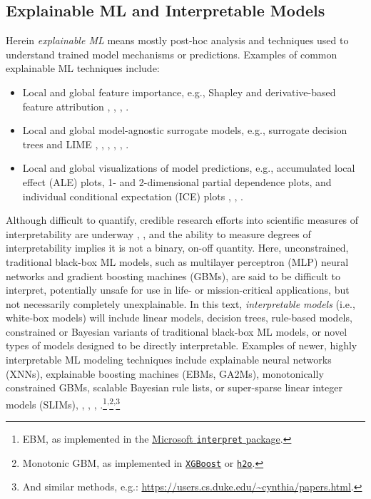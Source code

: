 \documentclass{article}
\begin{document}
\subsection{Explainable ML and Interpretable Models }

Herein \textit{explainable ML} means mostly post-hoc analysis and techniques used to understand trained model mechanisms or predictions. Examples of common explainable ML techniques include:

\begin{itemize}
\item Local and global feature importance, e.g., Shapley and derivative-based feature attribution \cite{grad_attr} \cite{keinan2004fair}, \cite{shapley}, \cite{shapley1988shapley}, \cite{kononenko2010efficient}.
\item Local and global model-agnostic surrogate models, e.g., surrogate decision trees and LIME \cite{dt_surrogate2}, \cite{viper}, \cite{dt_surrogate1}, \cite{lime-sup}, \cite{lime}, \cite{wf_xnn}. 
\item Local and global visualizations of model predictions, e.g., accumulated local effect (ALE) plots, 1- and 2-dimensional partial dependence plots, and individual conditional expectation (ICE) plots \cite{ale_plot}, \cite{esl}, \cite{ice_plots}.
\end{itemize}  

Although difficult to quantify, credible research efforts into scientific measures of interpretability are underway \cite{friedler2019assessing}, \cite{molnar2019quantifying}, and the ability to measure degrees of interpretability implies it is not a binary, on-off quantity. Here, unconstrained, traditional black-box ML models, such as multilayer perceptron (MLP) neural networks and gradient boosting machines (GBMs), are said to be difficult to interpret, potentially unsafe for use in life- or mission-critical applications, but not necessarily completely unexplainable. In this text, \textit{interpretable models} (i.e., white-box models) will include linear models, decision trees, rule-based models, constrained or Bayesian variants of traditional black-box ML models, or novel types of models designed to be directly interpretable. Examples of newer, highly interpretable ML modeling techniques include explainable neural networks (XNNs), explainable boosting machines (EBMs, GA2Ms), monotonically constrained GBMs, scalable Bayesian rule lists, or super-sparse linear integer models (SLIMs), \cite{ga2m}, \cite{slim}, \cite{wf_xnn}, \cite{sbrl}.\footnote{\scriptsize{EBM, as implemented in the \href{https://github.com/microsoft/interpret}{Microsoft \texttt{interpret} package}.}}\textsuperscript{,}\footnote{\scriptsize{Monotonic GBM, as implemented in \href{https://xgboost.readthedocs.io/en/latest/tutorials/monotonic.html}{\texttt{XGBoost}} or \href{https://github.com/h2oai/h2o-3/blob/master/h2o-py/demos/H2O_tutorial_gbm_monotonicity.ipynb}{\texttt{h2o}}.}}\textsuperscript{,}\footnote{\scriptsize{And similar methods, e.g.: \url{https://users.cs.duke.edu/~cynthia/papers.html}}.}
\end{document}
